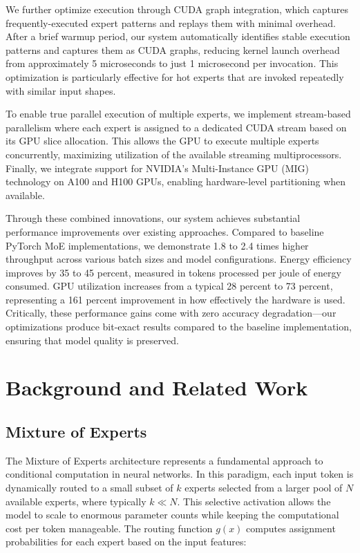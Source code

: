 \documentclass{article}
\begin{document}
We further optimize execution through CUDA graph integration, which captures frequently-executed expert patterns and replays them with minimal overhead. After a brief warmup period, our system automatically identifies stable execution patterns and captures them as CUDA graphs, reducing kernel launch overhead from approximately 5 microseconds to just 1 microsecond per invocation. This optimization is particularly effective for hot experts that are invoked repeatedly with similar input shapes.

To enable true parallel execution of multiple experts, we implement stream-based parallelism where each expert is assigned to a dedicated CUDA stream based on its GPU slice allocation. This allows the GPU to execute multiple experts concurrently, maximizing utilization of the available streaming multiprocessors. Finally, we integrate support for NVIDIA's Multi-Instance GPU (MIG) technology on A100 and H100 GPUs, enabling hardware-level partitioning when available.

Through these combined innovations, our system achieves substantial performance improvements over existing approaches. Compared to baseline PyTorch MoE implementations, we demonstrate 1.8 to 2.4 times higher throughput across various batch sizes and model configurations. Energy efficiency improves by 35 to 45 percent, measured in tokens processed per joule of energy consumed. GPU utilization increases from a typical 28 percent to 73 percent, representing a 161 percent improvement in how effectively the hardware is used. Critically, these performance gains come with zero accuracy degradation—our optimizations produce bit-exact results compared to the baseline implementation, ensuring that model quality is preserved.

\section{Background and Related Work}

\subsection{Mixture of Experts}

The Mixture of Experts architecture represents a fundamental approach to conditional computation in neural networks. In this paradigm, each input token is dynamically routed to a small subset of $k$ experts selected from a larger pool of $N$ available experts, where typically $k \ll N$. This selective activation allows the model to scale to enormous parameter counts while keeping the computational cost per token manageable. The routing function $g(x)$ computes assignment probabilities for each expert based on the input features:
\end{document}
